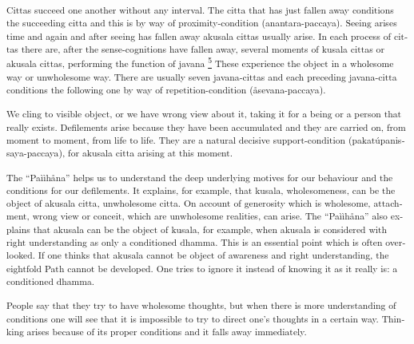 \textsuperscript{\textenglish[variant=american]{Cittas succeed one
another without any interval. The citta that has just fallen away
conditions the succeeding citta and this is by way of
proximity-condition}\textdutch{
(}anantara-paccaya\textdutch{)}\textenglish[variant=american]{. Seeing
arises time and again and after seeing has fallen away akusala cittas
usually arise. In each process of cittas there are, after the
sense-cognitions have fallen away, several moments of kusala cittas or
akusala cittas, }\textdutch{performing the function of javana
\protect\hyperlink{sdfootnote5sym}{\textsuperscript{5}}}\textenglish[variant=american]{
These experience the object in a wholesome way or unwholesome way. There
are usually seven javana-cittas and each preceding javana-citta
conditions the following one by way of repetition-condition
}\textdutch{(å}\textitalian{sevana-paccaya}\textdutch{)}.}

\textsuperscript{\textenglish[variant=american]{We cling to visible
object, or we have wrong view about it, taking it for a being or a
person that really exists. Defilements arise because they have been
accumulated and they are carried on, from moment to moment, from life to
life. They are a natural decisive support-condition}\textdutch{
(}pakat\textdutch{ú}\textitalian{panissaya-paccaya}\textdutch{)}\textenglish[variant=american]{,
for akusala citta arising at this moment. }}

\textsuperscript{\textenglish[variant=american]{The
}``Pa\textdutch{ììhåna}'' \textenglish[variant=american]{helps us to
understand the deep underlying motives for our behaviour and the
conditions for our defilements. It explains, for example, that kusala,
wholesomeness, can be the object of akusala citta, unwholesome citta. On
account of generosity which is wholesome, attachment, wrong view or
conceit, which are unwholesome realities, can arise. The
}``Pa\textitalian{ìì}h\textdanish{å}na''
\textenglish[variant=american]{also explains that akusala can be the
object of kusala, for example, when akusala is considered with
}\textdutch{right understanding as only a conditioned dhamma.
}\textenglish[variant=american]{This is an essential point which is
often overlooked. If one thinks that akusala cannot be object of
awareness and right understanding, the eightfold Path cannot be
developed. }\textdutch{One tries to ignore it instead of knowing it as
it really is: a conditioned dhamma. }}

\textsuperscript{\textdutch{People say that they try to have wholesome
thoughts, but when there is more understanding of conditions one will
see that it is impossible to try to direct one's thoughts in a certain
way. Thinking arises because of its proper conditions and it falls away
immediately.}}

